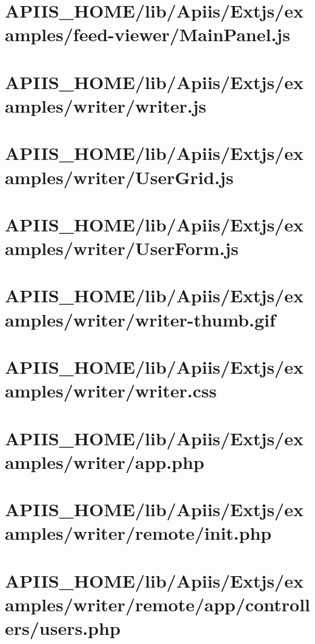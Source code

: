 \section{APIIS\_HOME/lib/Apiis/Extjs/examples/feed-viewer/MainPanel.js} 
\section{APIIS\_HOME/lib/Apiis/Extjs/examples/writer/writer.js} 
\section{APIIS\_HOME/lib/Apiis/Extjs/examples/writer/UserGrid.js} 
\section{APIIS\_HOME/lib/Apiis/Extjs/examples/writer/UserForm.js} 
\section{APIIS\_HOME/lib/Apiis/Extjs/examples/writer/writer-thumb.gif} 
\section{APIIS\_HOME/lib/Apiis/Extjs/examples/writer/writer.css} 
\section{APIIS\_HOME/lib/Apiis/Extjs/examples/writer/app.php} 
\section{APIIS\_HOME/lib/Apiis/Extjs/examples/writer/remote/init.php} 
\section{APIIS\_HOME/lib/Apiis/Extjs/examples/writer/remote/app/controllers/users.php} 

